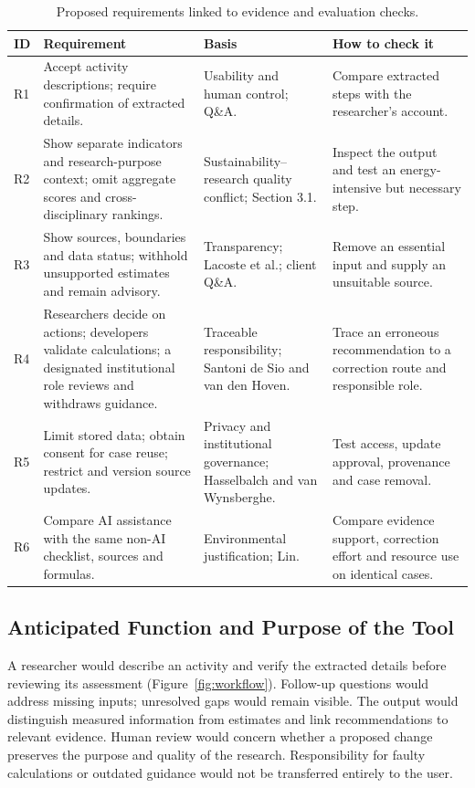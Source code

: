 \documentclass[11pt,a4paper]{article}
\renewcommand{\arraystretch}{1.15}
\begin{document}
\begin{table}[!htbp]
\centering\footnotesize
\renewcommand{\arraystretch}{1.2}
\begin{tabularx}{\textwidth}{@{}p{}>{\raggedright\arraybackslash}X>{\raggedright\arraybackslash}p{}>{\raggedright\arraybackslash}X@{}}
\toprule
ID & Requirement & Basis & How to check it \\
\midrule
R1 & Accept activity descriptions; require confirmation of extracted details. & Usability and human control; Q\&A. & Compare extracted steps with the researcher's account. \\
\midrule
R2 & Show separate indicators and research-purpose context; omit aggregate scores and cross-disciplinary rankings. & Sustainability--research quality conflict; Section 3.1. & Inspect the output and test an energy-intensive but necessary step. \\
\midrule
R3 & Show sources, boundaries and data status; withhold unsupported estimates and remain advisory. & Transparency; Lacoste et al.; client Q\&A. & Remove an essential input and supply an unsuitable source. \\
\midrule
R4 & Researchers decide on actions; developers validate calculations; a designated institutional role reviews and withdraws guidance. & Traceable responsibility; Santoni de Sio and van den Hoven. & Trace an erroneous recommendation to a correction route and responsible role. \\
\midrule
R5 & Limit stored data; obtain consent for case reuse; restrict and version source updates. & Privacy and institutional governance; Hasselbalch and van Wynsberghe. & Test access, update approval, provenance and case removal. \\
\midrule
R6 & Compare AI assistance with the same non-AI checklist, sources and formulas. & Environmental justification; Lin. & Compare evidence support, correction effort and resource use on identical cases. \\
\bottomrule
\end{tabularx}
\caption{Proposed requirements linked to evidence and evaluation checks.}
\label{tab:requirements}
\end{table}

\FloatBarrier
\subsection{Anticipated Function and Purpose of the Tool}
A researcher would describe an activity and verify the extracted details before reviewing its assessment (Figure~\ref{fig:workflow}). Follow-up questions would address missing inputs; unresolved gaps would remain visible. The output would distinguish measured information from estimates and link recommendations to relevant evidence. Human review would concern whether a proposed change preserves the purpose and quality of the research. Responsibility for faulty calculations or outdated guidance would not be transferred entirely to the user.
\end{document}
